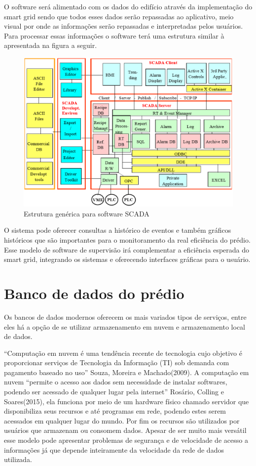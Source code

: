 O software será alimentado com os dados do edifício através da implementação do smart grid sendo que todos esses dados serão repassadas ao aplicativo, meio visual por onde as informações serão repassadas e interpretadas pelos usuários.
Para processar essas informações o software terá uma estrutura similar à apresentada na figura a seguir.
\pagebreak
\begin{figure}[!h]
 \centering	\includegraphics[keepaspectratio=true,scale=0.6]{figuras/sof.eps}
 \caption{Estrutura genérica para software SCADA }
 \label{fig022}
\end{figure}

O sistema pode oferecer consultas a histórico de eventos e também gráficos históricos que são importantes para o monitoramento da real eficiência do prédio. Esse modelo de software de supervisão irá complementar a eficiência esperada do smart grid, integrando os sistemas e oferecendo interfaces gráficas para o usuário.


		\section{Banco de dados do prédio}


Os bancos de dados modernos oferecem os mais variados tipos de serviços, entre eles há a opção de se utilizar armazenamento em nuvem e armazenamento local de dados.

“Computação em nuvem é uma tendência recente de tecnologia cujo objetivo é proporcionar serviços de Tecnologia da Informação (TI) sob demanda com pagamento baseado no uso” Souza, Moreira e Machado(2009). A computação em nuvem “permite o acesso aos dados sem necessidade de instalar softwares, podendo ser acessado de qualquer lugar pela internet” Rosário, Colling e Soares(2015), ela funciona por meio de um hardware físico chamado servidor que disponibiliza seus recursos e até programas em rede, podendo estes serem acessados em qualquer lugar do mundo. Por fim os recursos são utilizados por usuários que armazenam ou consomem dados. Apesar de ser muito mais versátil esse modelo pode apresentar problemas de segurança e de velocidade de acesso a informações já que depende inteiramente da velocidade da rede de dados utilizada.

